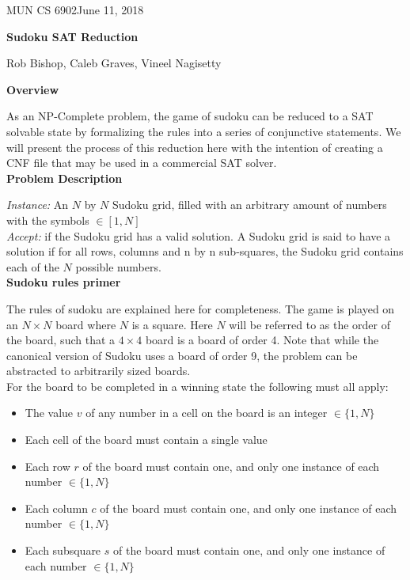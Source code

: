 \documentclass[11pt]{article}
\def\CourseCode{6902}			%
\def\DateHandedOut{June 11, 2018}	%
\begin{document}
\noindent
MUN CS \CourseCode \hfill \DateHandedOut\\
\begin{center}
\textbf{Sudoku SAT Reduction}

\medskip
Rob Bishop, Caleb Graves, Vineel Nagisetty
\end{center}

\textbf{Overview}

As an NP-Complete problem, the game of sudoku can be reduced to a SAT solvable state by formalizing the rules into a series of conjunctive statements. We will present the process of this reduction here with the intention of creating a CNF file that may be used in a commercial SAT solver.\\

\textbf{Problem Description}

\emph{Instance:}  An $N$ by $N$ Sudoku grid, filled with an arbitrary amount of numbers with the symbols $\in [1,N]$ \\

\emph{Accept:} if the Sudoku grid has a valid solution. A Sudoku grid is said to have a solution if for all rows, columns and n by n sub-squares, the Sudoku grid contains each of the $N$ possible numbers.\\ 

\textbf{Sudoku rules primer}

The rules of sudoku are explained here for completeness. The game is played on an $N\times N$ board where $N$ is a square. Here $N$ will be referred to as the order of the board, such that a $4 \times 4$ board is a board of order 4. Note that while the canonical version of Sudoku uses a board of order 9, the problem can be abstracted to arbitrarily sized boards.\\

For the board to be completed in a winning state the following must all apply:
\begin{itemize}
\item The value $v$ of any number in a cell on the board is an integer $\in \{1, N\}$

\item Each cell of the board must contain a single value

\item Each row $r$ of the board must contain one, and only one instance of each number $\in \{1, N\}$

\item Each column $c$ of the board must contain one, and only one instance of each number $\in \{1, N\}$

\item Each subsquare $s$ of the board must contain one, and only one instance of each number $\in \{1, N\}$

\end{itemize}
\end{document}
